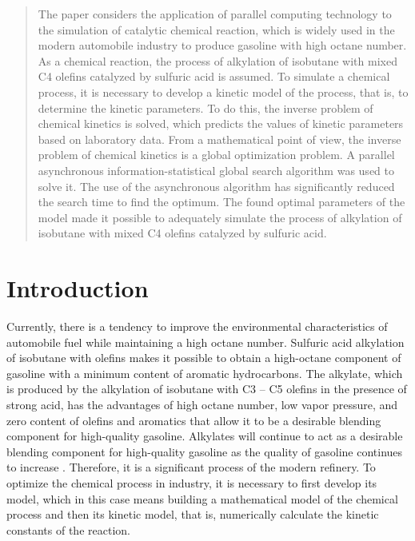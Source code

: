 \documentclass{svproc}
\begin{document}
\begin{abstract}

The paper considers the application of parallel computing technology to the simulation of catalytic chemical reaction, which is widely used in the modern automobile industry to produce gasoline with high octane number. As a chemical reaction, the process of alkylation of isobutane with mixed C4 olefins catalyzed by sulfuric acid is assumed. To simulate a chemical process, it is necessary to develop a kinetic model of the process, that is, to determine the kinetic parameters. To do this, the inverse problem of chemical kinetics is solved, which predicts the values of kinetic parameters based on laboratory data. From a mathematical point of view, the inverse problem of chemical kinetics is a global optimization problem. A parallel asynchronous information-statistical global search algorithm was used to solve it. The use of the asynchronous algorithm has significantly reduced the search time to find the optimum. The found optimal parameters of the model made it possible to adequately simulate the process of alkylation of isobutane with mixed C4 olefins catalyzed by sulfuric acid.

\end{abstract}

\section{Introduction}

Currently, there is a tendency to improve the environmental characteristics of automobile fuel while maintaining a high octane number. Sulfuric acid alkylation of isobutane with olefins makes it possible to obtain a high-octane component of gasoline with a minimum content of aromatic hydrocarbons. The alkylate, which is produced by the alkylation of isobutane with C3 -- C5 olefins in the presence of strong acid, has the advantages of high octane number, low vapor pressure, and zero content of olefins and aromatics that allow it to be a desirable blending component for high-quality gasoline. Alkylates will continue to act as a desirable blending component for high-quality gasoline as the quality of gasoline continues to increase \cite{cao2019}. Therefore, it is a significant process of the modern refinery. To optimize the chemical process in industry, it is necessary to first develop its model, which in this case means building a mathematical model of the chemical process and then its kinetic model, that is, numerically calculate the kinetic constants of the reaction. 
\end{document}
